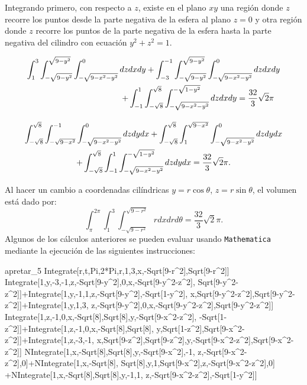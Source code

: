 Integrando primero, con respecto a $z$, existe en el plano $xy$ una región donde $z$ recorre los puntos desde la parte negativa de la esfera al plano
$z=0$ y otra región donde $z$ recorre los puntos de la parte negativa de la esfera hasta la parte negativa del cilindro con ecuación $y^2+z^2=1$.

\clearpage
{\setlength{\abovedisplayskip}{0pt}
\setlength{\abovedisplayshortskip}{0pt}
\begin{multline*}
\int_{1}^{3}\int_{-\sqrt{9-y^2}}^{\sqrt{9-y^2}}\int_{-\sqrt{9-x^2 -y^2 }}^{0}dzdxdy+\int_{-3}^{-1}\int_{-\sqrt{9-y^2 }}^{\sqrt{9-y^2 }}\int_{-\sqrt{9-x^2 -y^2 }}^{0}dzdxdy\\
 \shoveright{+\int_{-1}^{1}\int_{-\sqrt{8}}^{\sqrt{8}}\int_{-\sqrt{9-x^2 -y^2 }}^{-\sqrt{1-y^2 }}dzdxdy= \frac{32}{3}\sqrt{2}\pi}\\[1em]
\int_{-\sqrt{8}}^{\sqrt{8}}\int_{-\sqrt{9-x^2 }}^{-1}\int_{-\sqrt{9-x^2 -y^2 }}^{0}dzdydx+\int_{-\sqrt{8}}^{\sqrt{8}}\int_{1}^{\sqrt{9-x^2 }}\int_{-\sqrt{9-x^2 -y^2 }}^{0}dzdydx\\
+\int_{-\sqrt{8}}^{\sqrt{8}}\int_{-1}^{1}\int_{-\sqrt{9-x^2 -y^2 }}^{-\sqrt{1-y^2 }}dzdydx= \frac{32}{3}\sqrt{2}\pi.
\end{multline*}}

\enlargethispage*{\baselineskip}

Al hacer un cambio a coordenadas cilíndricas $y = r\cos \theta$, $z = r\sin \theta$, el volumen está dado por:
\[\int_{\pi}^{2\pi}\int_{1}^{3}\int_{-\sqrt{9-r^2}}^{\sqrt{9-r^2}}rdxdrd\theta=\frac{32}{3}\sqrt{2}\pi.\]
Algunos de los cálculos anteriores se pueden evaluar usando \verb"Mathematica"
mediante la ejecución de las siguientes instrucciones:

\begin{SaveVerbatim}{apretar_5}
Integrate[r,{t,Pi,2*Pi},{r,1,3},{x,-Sqrt[9-r^2],Sqrt[9-r^2]}]
Integrate[1,{y,-3,-1},{z,-Sqrt[9-y^2],0},{x,-Sqrt[9-y^2-z^2],
Sqrt[9-y^2-z^2]}]+Integrate[1,{y,-1,1},{z,-Sqrt[9-y^2],-Sqrt[1-y^2]},
{x,Sqrt[9-y^2-z^2],Sqrt[9-y^2-z^2]}]+Integrate[1,{y,1,3},
{z,-Sqrt[9-y^2],0},{x,-Sqrt[9-y^2-z^2],Sqrt[9-y^2-z^2]}]
Integrate[1,{z,-1,0},{x,-Sqrt[8],Sqrt[8]},{y,-Sqrt[9-x^2-z^2],
-Sqrt[1-z^2]}]+Integrate[1,{z,-1,0},{x,-Sqrt[8],Sqrt[8]},
{y,Sqrt[1-z^2],Sqrt[9-x^2-z^2]}]+Integrate[1,{z,-3,-1},
{x,Sqrt[9-z^2],Sqrt[9-z^2]},{y,-Sqrt[9-x^2-z^2],Sqrt[9-x^2-z^2]}]
NIntegrate[1,{x,-Sqrt[8],Sqrt[8]},{y,-Sqrt[9-x^2],-1},
{z,-Sqrt[9-x^2-z^2],0}]+NIntegrate[1,{x,-Sqrt[8],
Sqrt[8]},{y,1,Sqrt[9-x^2]},{z,-Sqrt[9-x^2-z^2],0}]
+NIntegrate[1,{x,-Sqrt[8],Sqrt[8]},{y,-1,1},
{z,-Sqrt[9-x^2-z^2],-Sqrt[1-y^2]}]
\end{SaveVerbatim}

